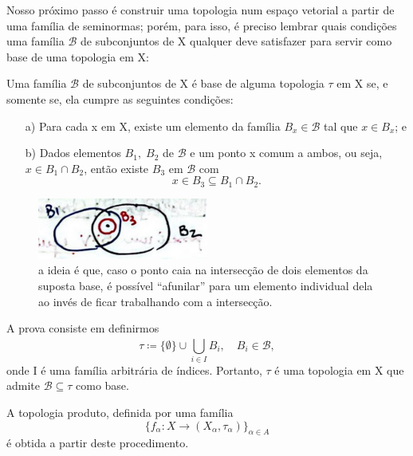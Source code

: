 \documentclass[../distribution_theory_notes.tex]{subfiles}
\begin{document}
  Nosso próximo passo é construir uma topologia num espaço vetorial a partir de uma família de seminormas; porém, para isso, é preciso lembrar quais condições uma família \(\mathcal{B}\) de subconjuntos de X qualquer deve satisfazer para servir como base de uma topologia em X:
  \begin{theorem*}
    Uma família \(\mathcal{B}\) de subconjuntos de X é base de alguma topologia \(\tau \) em X se, e somente se, ela cumpre as seguintes condições: 
   \begin{itemize}
     \item[a)] Para cada x em X, existe um elemento da família \(B_{x}\in \mathcal{B}\) tal que \(x\in B_{x}\); e 
       \item[b)] Dados elementos \(B_1,\; B_2\) de \(\mathcal{B}\) e um ponto x comum a ambos, ou seja, \(x\in B_1\cap B_2\), então existe \(B_3\) em \(\mathcal{B}\) com 
       \[
       x\in B_3\subseteq B_1\cap B_2.
       \]
   \end{itemize}
  \end{theorem*}
 \begin{figure}[H]
 \begin{center}
 \includegraphics[height=0.5\textheight, width=0.5\textwidth, keepaspectratio]{./Images/basis_X_02.png}
 \end{center}
 \caption{a ideia é que, caso o ponto caia na intersecção de dois elementos da suposta base, é possível ``afunilar'' para um elemento individual dela ao invés de ficar trabalhando com a intersecção.}
 \end{figure}
 \begin{proof*}
   A prova consiste em definirmos 
     \[
       \tau \coloneqq \{\emptyset \}\cup \bigcup_{i\in I}^{}B_{i}, \quad B_{i}\in \mathcal{B},
     \]
     onde I é uma família arbitrária de índices. Portanto, \(\tau \) é uma topologia em X que admite \(\mathcal{B}\subseteq \tau \) como base. \qedsymbol
 \end{proof*}
\begin{example}
  A topologia produto, definida por uma família 
    \[
      \{f_{\alpha }:X\rightarrow (X_{\alpha }, \tau_{\alpha })\}_{\alpha \in A}
    \]
    é obtida a partir deste procedimento.
\end{example}
\end{document}
